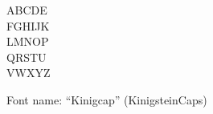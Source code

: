 \documentclass[a4paper]{article}
\begin{document}
\begin{center}
\fontsize{60pt}{72pt}
  ABCDE \\
  FGHIJK \\
  LMNOP \\
  QRSTU \\
  VWXYZ \\
\end{center}
\vfill
\begin{center}
Font name: ``Kinigcap'' (KinigsteinCaps)
\end{center}
\end{document}
